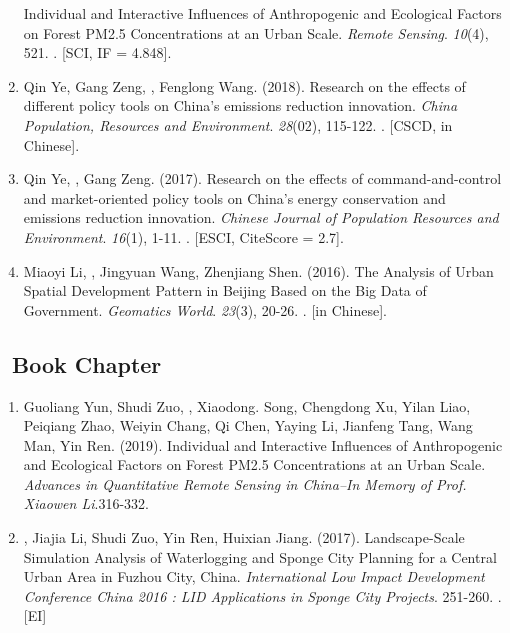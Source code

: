 \begin{enumerate}
	Individual and Interactive Influences of Anthropogenic and Ecological Factors on Forest PM2.5 Concentrations at an Urban Scale.
    \textit{Remote Sensing}. \textit{10}(4), 521.
    . [SCI, IF = 4.848].
\item
    Qin Ye, Gang Zeng, \Shaoqing, Fenglong Wang. (2018).
	Research on the effects of different policy tools on China’s emissions reduction innovation.
    \textit{China Population, Resources and Environment}. \textit{28}(02), 115-122.
    . [CSCD, in Chinese].
\item
    Qin Ye, \Shaoqing, Gang Zeng. (2017).
	Research on the effects of command-and-control and market-oriented policy tools on China’s energy conservation and emissions reduction innovation.
    \textit{Chinese Journal of Population Resources and Environment}. \textit{16}(1), 1-11.
    . [ESCI, CiteScore = 2.7].
\item
    Miaoyi Li, \Shaoqing, Jingyuan Wang, Zhenjiang Shen. (2016).
	The Analysis of Urban Spatial Development Pattern in Beijing Based on the Big Data of Government.
    \textit{Geomatics World}. \textit{23}(3), 20-26.
    . [in Chinese].
\end{enumerate}

\subsection*{\texorpdfstring{\faBook\ Book Chapter}{Book Chapter}}
\begin{enumerate}
\item
    Guoliang Yun, Shudi Zuo, \Shaoqing, Xiaodong. Song, Chengdong Xu, Yilan Liao, Peiqiang Zhao, Weiyin Chang, Qi Chen, Yaying Li, Jianfeng Tang, Wang Man, Yin Ren. (2019).
	Individual and Interactive Influences of Anthropogenic and Ecological Factors on Forest PM2.5 Concentrations at an Urban Scale.
    \textit{Advances in Quantitative Remote Sensing in China–In Memory of Prof. Xiaowen Li}.316-332.
\item
    \Shaoqing, Jiajia Li, Shudi Zuo, Yin Ren, Huixian Jiang. (2017).
	Landscape-Scale Simulation Analysis of Waterlogging and Sponge City Planning for a Central Urban Area in Fuzhou City, China.
    \textit{International Low Impact Development Conference China 2016 : LID Applications in Sponge City Projects}. 251-260.
    . [EI]
\end{enumerate}

